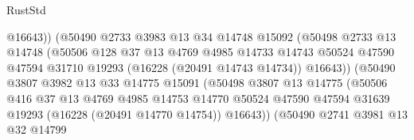 \begin{lexlean}{RustStd}
\begin{coremodule}
                                    @16643))
                                (@50490
                                  @2733
                                  @3983
                                  @13
                                  @34
                                  @14748
                                  @15092
                                  (@50498
                                    @2733
                                    @13
                                    @14748
                                    (@50506
                                      @128
                                      @37
                                      @13
                                      @4769
                                      @4985
                                      @14733
                                      @14743
                                      @50524
                                      @47590
                                      @47594
                                      @31710
                                      @19293
                                      (@16228 (@20491 @14743 @14734))
                                      @16643))
                                  (@50490
                                    @3807
                                    @3982
                                    @13
                                    @33
                                    @14775
                                    @15091
                                    (@50498
                                      @3807
                                      @13
                                      @14775
                                      (@50506
                                        @416
                                        @37
                                        @13
                                        @4769
                                        @4985
                                        @14753
                                        @14770
                                        @50524
                                        @47590
                                        @47594
                                        @31639
                                        @19293
                                        (@16228 (@20491 @14770 @14754))
                                        @16643))
                                    (@50490
                                      @2741
                                      @3981
                                      @13
                                      @32
                                      @14799

\end{coremodule}
\end{lexlean}
